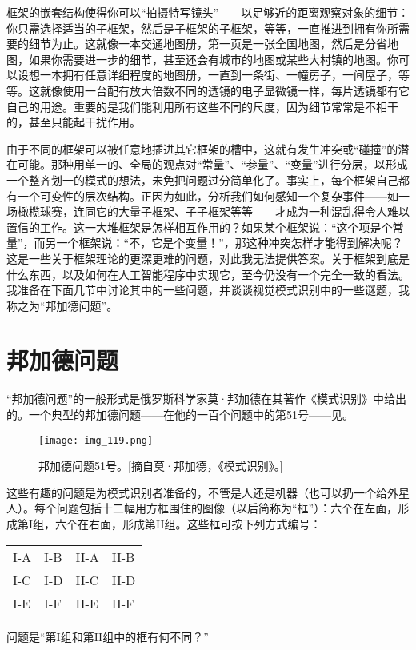框架的嵌套结构使得你可以“拍摄特写镜头”——以足够近的距离观察对象的细节：你只需选择适当的子框架，然后是子框架的子框架，等等，一直推进到拥有你所需要的细节为止。这就像一本交通地图册，第一页是一张全国地图，然后是分省地图，如果你需要进一步的细节，甚至还会有城市的地图或某些大村镇的地图。你可以设想一本拥有任意详细程度的地图册，一直到一条街、一幢房子，一间屋子，等等。这就像使用一台配有放大倍数不同的透镜的电子显微镜一样，每片透镜都有它自己的用途。重要的是我们能利用所有这些不同的尺度，因为细节常常是不相干的，甚至只能起干扰作用。

由于不同的框架可以被任意地插进其它框架的槽中，这就有发生冲突或“碰撞”的潜在可能。那种用单一的、全局的观点对“常量”、“参量”、“变量”进行分层，以形成一个整齐划一的模式的想法，未免把问题过分简单化了。事实上，每个框架自己都有一个可变性的层次结构。正因为如此，分析我们如何感知一个复杂事件——如一场橄榄球赛，连同它的大量子框架、子子框架等等——才成为一种混乱得令人难以置信的工作。这一大堆框架是怎样相互作用的？如果某个框架说：“这个项是个常量”，而另一个框架说：“不，它是个变量！”，那这种冲突怎样才能得到解决呢？这是一些关于框架理论的更深更难的问题，对此我无法提供答案。关于框架到底是什么东西，以及如何在人工智能程序中实现它，至今仍没有一个完全一致的看法。我准备在下面几节中讨论其中的一些问题，并谈谈视觉模式识别中的一些谜题，我称之为“邦加德问题”。

\section{邦加德问题}

“邦加德问题”的一般形式是俄罗斯科学家莫·邦加德在其著作《模式识别》中给出的。一个典型的邦加德问题——在他的一百个问题中的第51号——见。

\begin{figure}
\texttt{[image: img\_119.png]}
\caption[邦加德问题51号。]
  {邦加德问题51号。[摘自莫·邦加德，《模式识别》。] }
\end{figure}

这些有趣的问题是为模式识别者准备的，不管是人还是机器（也可以扔一个给外星人）。每个问题包括十二幅用方框围住的图像（以后简称为“框”）：六个在左面，形成第I组，六个在右面，形成第II组。这些框可按下列方式编号：
\begin{center}
\begin{tabular}{ll!{\qquad}ll}
I-A&I-B&II-A&II-B\\
I-C&I-D&II-C&II-D\\
I-E&I-F&II-E&II-F
\end{tabular}
\end{center}
问题是“第I组和第II组中的框有何不同？”

